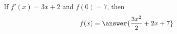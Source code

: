 \documentclass{ximera}
\author{Gregory Hartman \and Matthew Carr}
\begin{document}
\begin{exercise}

If $f'(x)=3x+2$ and $f(0)=7$, then
\[
f(x)=\answer{\frac{3x^2}{2}+2x+7}
\]


\end{exercise}
\end{document}
